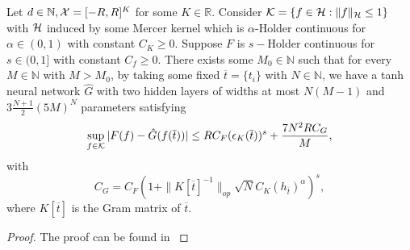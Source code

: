 \begin{lemma}
\label{lemma: RKHS approximation}

Let $d \in \mathbb{N}, {\mathcal{X}} = [-R, R]^K$ for some $K \in \mathbb{R}$. Consider ${\mathcal{K}} = \{f \in {\mathcal{H}}: \|f\|_{{\mathcal{H}}} \leq 1\}$ with ${\mathcal{H}}$ induced by some Mercer kernel which is $\alpha$-Holder continuous for $\alpha \in (0, 1)$ with constant $C_K \geq 0$. Suppose $F$ is $s-$Holder continuous for $s \in (0, 1]$ with constant $C_f \geq 0$. There exists some $M_0 \in \mathbb{N}$ such that for every $M \in \mathbb{N}$ with $M > M_0$, by taking some fixed $\overline{t}= \{t_i\}$ with $N  \in \mathbb{N}$, we have a tanh neural network $\hat{G}$ with two hidden layers of widths at most $N(M-1)$ and $3\frac{N+1}{2}(5M)^N$ parameters satisfying 
    \begin{equation}
    \label{inequality: rkhs approximation}
        \sup_{f \in {\mathcal{K}}}|F(f) - \hat{G}(f(\overline{t}))| \leq RC_F(\epsilon_K(\overline{t}))^s + \frac{7N^2R C_G}{M},
    \end{equation}
    with 
    \begin{equation*}
        C_G = C_F(1+\|K[\overline{t}]^{-1}\|_{op}\sqrt{N}C_K(h_{\overline{t}})^\alpha)^s,
    \end{equation*}
    where $K[\overline{t}]$ is the Gram matrix of $\overline{t}$.
\end{lemma}
\begin{proof}
    The proof can be found in \cite{rkhsapprox}
\end{proof}

